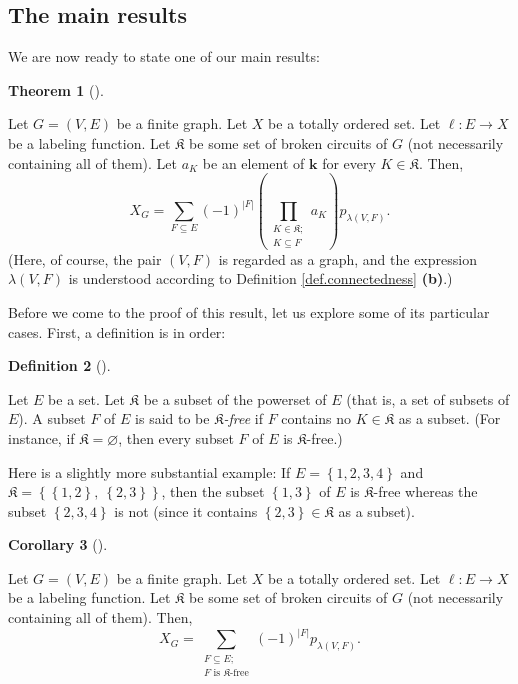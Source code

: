 \documentclass[numbers=enddot,12pt,final,onecolumn,notitlepage]{scrartcl}%
\theoremstyle{definition}
\newtheorem{theo}{Theorem}[section]
\newenvironment{theorem}[1][]
{\begin{theo}[#1]\begin{leftbar}}
{\end{leftbar}\end{theo}}
\newtheorem{defi}[theo]{Definition}
\newenvironment{definition}[1][]
{\begin{defi}[#1]\begin{leftbar}}
{\end{leftbar}\end{defi}}
\newtheorem{coro}[theo]{Corollary}
\newenvironment{corollary}[1][]
{\begin{coro}[#1]\begin{leftbar}}
{\end{leftbar}\end{coro}}
\let\sumnonlimits\sum
\let\prodnonlimits\prod
\renewcommand{\sum}{\sumnonlimits\limits}
\renewcommand{\prod}{\prodnonlimits\limits}
\begin{document}
\subsection{The main results}

We are now ready to state one of our main results:

\begin{theorem}
\label{thm.chromsym.varis}Let $G=\left(  V,E\right)  $ be a finite graph. Let
$X$ be a totally ordered set. Let $\ell:E\rightarrow X$ be a labeling
function. Let $\mathfrak{K}$ be some set of broken circuits of $G$ (not
necessarily containing all of them). Let $a_{K}$ be an element of $\mathbf{k}$
for every $K\in\mathfrak{K}$. Then,%
\[
X_{G}=\sum_{F\subseteq E}\left(  -1\right)  ^{\left\vert F\right\vert }\left(
\prod_{\substack{K\in\mathfrak{K};\\K\subseteq F}}a_{K}\right)  p_{\lambda
\left(  V,F\right)  }.
\]
(Here, of course, the pair $\left(  V,F\right)  $ is regarded as a graph, and
the expression $\lambda\left(  V,F\right)  $ is understood according to
Definition \ref{def.connectedness} \textbf{(b)}.)
\end{theorem}

Before we come to the proof of this result, let us explore some of its
particular cases. First, a definition is in order:

\begin{definition}
\label{def.K-free}Let $E$ be a set. Let $\mathfrak{K}$ be a subset of the
powerset of $E$ (that is, a set of subsets of $E$). A subset $F$ of $E$ is
said to be $\mathfrak{K}$\emph{-free} if $F$ contains no $K\in\mathfrak{K}$ as
a subset. (For instance, if $\mathfrak{K}=\varnothing$, then every subset $F$
of $E$ is $\mathfrak{K}$-free.)
\end{definition}

Here is a slightly more substantial example: If $E=\left\{  1,2,3,4\right\}  $
and $\mathfrak{K}=\left\{  \left\{  1,2\right\}  ,\ \left\{  2,3\right\}
\right\}  $, then the subset $\left\{  1,3\right\}  $ of $E$ is $\mathfrak{K}%
$-free whereas the subset $\left\{  2,3,4\right\}  $ is not (since it contains
$\left\{  2,3\right\}  \in\mathfrak{K}$ as a subset).

\begin{corollary}
\label{cor.chromsym.K-free}Let $G=\left(  V,E\right)  $ be a finite graph. Let
$X$ be a totally ordered set. Let $\ell:E\rightarrow X$ be a labeling
function. Let $\mathfrak{K}$ be some set of broken circuits of $G$ (not
necessarily containing all of them). Then,%
\[
X_{G}=\sum_{\substack{F\subseteq E;\\F\text{ is }\mathfrak{K}\text{-free}%
}}\left(  -1\right)  ^{\left\vert F\right\vert }p_{\lambda\left(  V,F\right)
}.
\]

\end{corollary}
\end{document}
